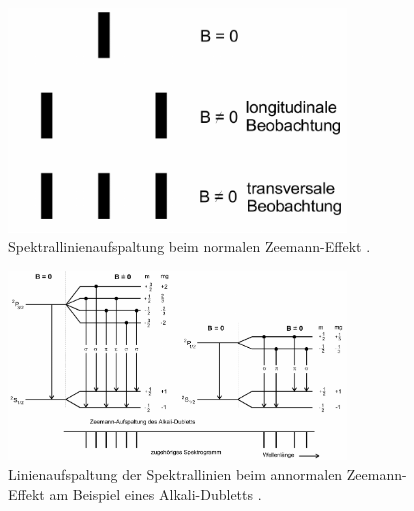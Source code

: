 \begin{figure}[htb]
  \centering
  \includegraphics[width=0.8\textwidth]{images/V27_4.pdf}
  \caption{Spektrallinienaufspaltung beim normalen Zeemann-Effekt \cite{anleitung}.}
  \label{abb:spektral}
\end{figure}

\begin{figure}[htb]
  \centering
  \includegraphics[width=0.8\textwidth]{images/V27_5.pdf}
  \caption{Linienaufspaltung der Spektrallinien beim annormalen Zeemann-Effekt am Beispiel eines Alkali-Dubletts \cite{anleitung}.}
  \label{abb:annormal}
\end{figure}
